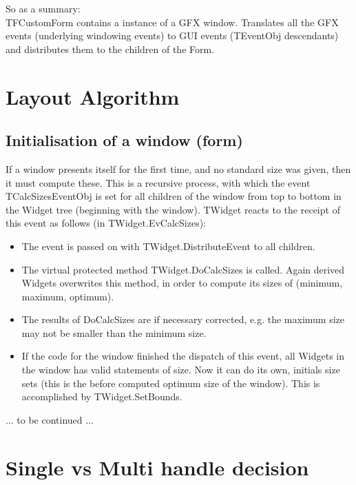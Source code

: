 \documentclass[a4paper,11pt]{report}
\begin{document}
So as a summary:\\
TFCustomForm contains a instance of a GFX window. Translates all the 
GFX events (underlying windowing events) to GUI events (TEventObj 
descendants) and distributes them to the children of the Form.


\chapter{Layout Algorithm}

\section{Initialisation of a window (form)}
If a window presents itself for the first time, and no standard size was
 given, then it must compute these.
 This is a recursive process, with which the event TCalcSizesEventObj is
 set for all children of the window from top to bottom in the Widget tree
 (beginning with the window).
 TWidget reacts to the receipt of this event as follows (in TWidget.EvCalcSizes):

\begin{itemize}
	\item The event is passed on with TWidget.DistributeEvent to all children.
	
	\item The virtual protected method TWidget.DoCalcSizes is called.
 Again derived Widgets overwrites this method, in order to compute its sizes
 of (minimum, maximum, optimum).
 
 	\item The results of DoCalcSizes are if necessary corrected, e.g.
 the maximum size may not be smaller than the minimum size.
 
 	\item If the code for the window finished the dispatch of this event, all Widgets
 in the window has valid statements of size.
 Now it can do its own, initials size sets (this is the before computed
 optimum size of the window).
 This is accomplished by TWidget.SetBounds.
\end{itemize}

... to be continued ...


\chapter{Single vs Multi handle decision}
\end{document}
